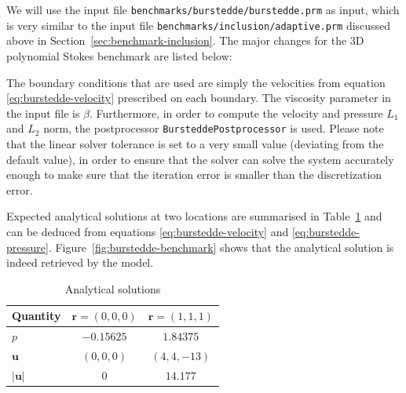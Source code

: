 \documentclass{article}
\begin{document}
We will use the input file \texttt{benchmarks/burstedde/burstedde.prm} as
input, which is very similar to the input file
\texttt{benchmarks/inclusion/adaptive.prm} discussed above in
Section~\ref{sec:benchmark-inclusion}. The major changes for the 3D polynomial
Stokes benchmark are listed below: 



The boundary conditions that are used are simply the velocities from equation
\eqref{eq:burstedde-velocity} prescribed on each boundary. The viscosity parameter in the input
file is $\beta$. Furthermore, in order to compute the velocity and pressure
$L_1$ and $L_2$ norm, the postprocessor \texttt{BursteddePostprocessor} is
used. Please note that the linear solver tolerance is set to a very small
value (deviating from the default value), in order to ensure that the solver
can solve the system accurately enough to make sure that the iteration
error is smaller than the discretization error.

Expected analytical solutions at two locations are summarised in Table~\ref{tab:burstedde-table} and can be deduced from equations \eqref{eq:burstedde-velocity} and
\eqref{eq:burstedde-pressure}.
Figure~\ref{fig:burstedde-benchmark} shows that the analytical solution is indeed retrieved by the model.

\begin{table}[h!]
\caption{Analytical solutions \label{tab:burstedde-table}}
\centering
\begin{tabular}{l|c|c}
Quantity & $\mathbf{r} = (0,0,0)$ & $\mathbf{r} = (1,1,1)$ \\ \hline
$p$ & $-0.15625$ & $1.84375$ \\
$\mathbf{u}$ & $(0,0,0)$  & $(4,4,-13)$ \\ 
$|\mathbf{u}|$ & $0$ &  $14.177$ \\
\end{tabular}
\end{table}
\end{document}
